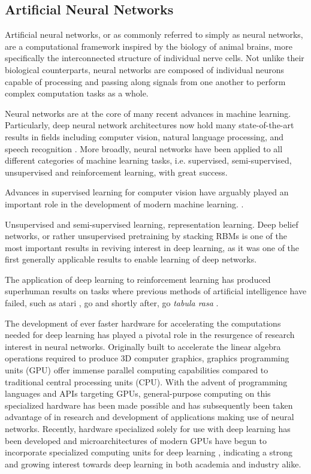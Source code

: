 \subsection{Artificial Neural Networks}
\label{section:artificial_neural_networks}

Artificial neural networks, or as commonly referred to simply as neural networks, are a computational framework inspired by the biology of animal brains, more specifically the interconnected structure of individual nerve cells. Not unlike their biological counterparts, neural networks are composed of individual neurons capable of processing and passing along signals from one another to perform complex computation tasks as a whole.

Neural networks are at the core of many recent advances in machine learning. Particularly, deep neural network architectures now hold many state-of-the-art results in fields including computer vision, natural language processing, and speech recognition \cite{deep_learning}. More broadly, neural networks have been applied to all different categories of machine learning tasks, i.e. supervised, semi-supervised, unsupervised and reinforcement learning, with great success.

Advances in supervised learning for computer vision have arguably played an important role in the development of modern machine learning. \cite{imagenet}.

Unsupervised and semi-supervised learning, representation learning. Deep belief networks, or rather unsupervised pretraining by stacking RBMs is one of the most important results in reviving interest in deep learning, as it was one of the first generally applicable results to enable learning of deep networks. 

The application of deep learning to reinforcement learning has produced superhuman results on tasks where previous methods of artificial intelligence have failed, such as atari \cite{deep_atari}, go \cite{alphago} and shortly after, go \textit{tabula rasa} \cite{alphazero}.

The development of ever faster hardware for accelerating the computations needed for deep learning has played a pivotal role in the resurgence of research interest in neural networks. Originally built to accelerate the linear algebra operations required to produce 3D computer graphics, graphics programming units (GPU) offer immense parallel computing capabilities compared to traditional central processing units (CPU). With the advent of programming languages and APIs targeting GPUs, general-purpose computing on this specialized hardware has been made possible and has subsequently been taken advantage of in research and development of applications making use of neural networks. Recently, hardware specialized solely for use with deep learning has been developed \cite{tpu} and microarchitectures of modern GPUs have begun to incorporate specialized computing units for deep learning \cite{nvidia_tensor_core}, indicating a strong and growing interest towards deep learning in both academia and industry alike.


